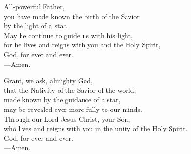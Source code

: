 \prayer

\begin{prayerverse}

All-powerful Father,\\
you have made known the birth of the Savior\\
by the light of a star.\\
May he continue to guide us with his light,\\
for he lives and reigns with you and the Holy Spirit,\\
God, for ever and ever.\\
{\color{red}---\thinspace}Amen.

\end{prayerverse}


\begin{prayerverse}

Grant, we ask, almighty God,\\
that the Nativity of the Savior of the world,\\
made known by the guidance of a star,\\
may be revealed ever more fully to our minds.\\
Through our Lord Jesus Christ, your Son,\\
who lives and reigns with you in the unity of the Holy Spirit,\\
God, for ever and ever.\\
{\color{red}---\thinspace}Amen.

\end{prayerverse}